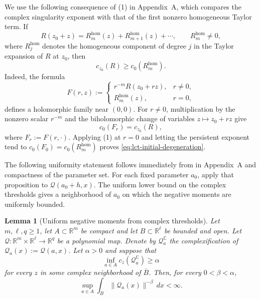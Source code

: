 \documentclass[reqno,11pt]{amsart}
\numberwithin{equation}{section}
\newtheorem{lemma}[theorem]{Lemma}
\theoremstyle{definition}
\theoremstyle{remark}
\begin{document}
We use the following consequence of (1)
in Appendix~A, which compares the complex singularity exponent with that
of the first nonzero homogeneous Taylor term. If
$$
R(z_0+z)
=
R_m^{\mathrm{hom}}(z)+R_{m+1}^{\mathrm{hom}}(z)+\cdots,
\qquad
R_m^{\mathrm{hom}}\ne0,
$$
where $R_j^{\mathrm{hom}}$ denotes the homogeneous component of degree $j$
in the Taylor expansion of $R$ at $z_0$,
then
\begin{equation}\label{eq:lct-initial-degeneration}
c_{z_0}(R)\ge c_0(R_m^{\mathrm{hom}}).
\end{equation}
Indeed, the formula
$$
F(r,z):=
\begin{cases}
r^{-m}R(z_0+rz),&r\ne0,\\
R_m^{\mathrm{hom}}(z),&r=0,
\end{cases}
$$
defines a holomorphic family near $(0,0)$. For $r\ne0$, multiplication by
the nonzero scalar $r^{-m}$ and the biholomorphic change of variables
$z\mapsto z_0+rz$ give
$$
c_0(F_r)=c_{z_0}(R),
$$
where $F_r:=F(r,\cdot)$. Applying (1) at $r=0$ and letting the
persistent exponent tend to $c_0(F_0)=c_0(R_m^{\mathrm{hom}})$ proves
\eqref{eq:lct-initial-degeneration}.

The following uniformity statement follows  immediately from
 in Appendix~A and compactness of the
parameter set. For each fixed parameter $a_0$, apply that
proposition to
$\mathcal Q(a_0+h,x)$. The uniform lower bound on the complex thresholds
gives a neighborhood of $a_0$ on which the negative moments are uniformly
bounded. 
\begin{lemma}[Uniform negative moments from complex thresholds]
\label{lem:uniform-negative-moments-complex}
Let $m, \ell, q \ge1$, let $A\subset\mathbb R^m$ be compact and let
$B\subset\mathbb R^\ell$ be bounded and open. Let
$\mathcal{Q}:\mathbb R^m\times\mathbb R^\ell\to \mathbb R^q $
be a polynomial map. Denote by
$\mathcal{Q}_a^{\mathbb C}$ the complexification of $\mathcal{Q}_a(x):=\mathcal{Q}(a,x)$. Let $\alpha>0$ and suppose that
\begin{equation}\label{eq:uniform-complex-threshold-hypothesis}
\inf_{a\in A} c_z(\mathcal{Q}_a^{\mathbb C})\ge\alpha
\end{equation}
for every $z$ in some complex neighborhood of $\overline{B}$. Then, for every $0<\beta<\alpha$,
\begin{equation}\label{eq:uniform-negative-moment-CM}
\sup_{a\in A}\int_B\|\mathcal{Q}_a(x)\|^{-\beta}\,dx<\infty.
\end{equation}
\end{lemma}
\end{document}
